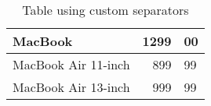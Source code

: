 \documentclass{article}
\begin{document}
\begin{table}
	\centering
	\begin{tabular}{| l | r @{,} l !{\$} |}
		\hline
		MacBook & 1299 & 00 \\
		\hline
		MacBook Air 11-inch & 899 & 99 \\
		\hline
		MacBook Air 13-inch & 999 & 99 \\
		\hline
	\end{tabular}
	\caption{Table using custom separators}
\end{table}
\end{document}
